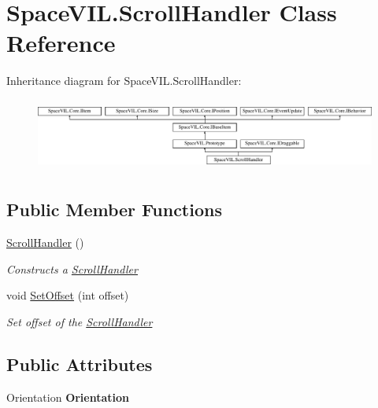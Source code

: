 \hypertarget{class_space_v_i_l_1_1_scroll_handler}{}\section{Space\+V\+I\+L.\+Scroll\+Handler Class Reference}
\label{class_space_v_i_l_1_1_scroll_handler}
Inheritance diagram for Space\+V\+I\+L.\+Scroll\+Handler\+:\begin{figure}[H]
\begin{center}
\leavevmode
\includegraphics[height=2.421622cm]{class_space_v_i_l_1_1_scroll_handler}
\end{center}
\end{figure}
\subsection*{Public Member Functions}
\begin{DoxyCompactItemize}
\item 
\mbox{\hyperlink{class_space_v_i_l_1_1_scroll_handler_a95452d5c586be5d21542dd743639cd62}{Scroll\+Handler}} ()
\begin{DoxyCompactList}\small\item\em Constructs a \mbox{\hyperlink{class_space_v_i_l_1_1_scroll_handler}{Scroll\+Handler}} \end{DoxyCompactList}\item 
void \mbox{\hyperlink{class_space_v_i_l_1_1_scroll_handler_abce983699a4e1e947d6e6b8f91a97080}{Set\+Offset}} (int offset)
\begin{DoxyCompactList}\small\item\em Set offset of the \mbox{\hyperlink{class_space_v_i_l_1_1_scroll_handler}{Scroll\+Handler}} \end{DoxyCompactList}\end{DoxyCompactItemize}
\subsection*{Public Attributes}
\begin{DoxyCompactItemize}
\item 
\mbox{\label{class_space_v_i_l_1_1_scroll_handler_a184a58ef8c4cfe2718a7b8131977c4e9}} 
Orientation {\bfseries Orientation}
\end{DoxyCompactItemize}
